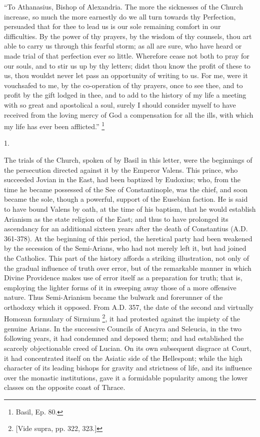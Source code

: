``To Athanasius, Bishop of Alexandria. The more the sicknesses
of the Church increase, so much the more earnestly do we all turn
towards thy Perfection, persuaded that for thee to lead us is our sole
remaining comfort in our difficulties. By the power of thy prayers, by
the wisdom of thy counsels, thou art able to carry us through this
fearful storm; as all are sure, who have heard or made trial of that
perfection ever so little. Wherefore cease not both to pray for our
souls, and to stir us up by thy letters; didst thou know the profit of
these to us, thou wouldst never let pass an opportunity of writing to
us. For me, were it vouchsafed to me, by the co-operation of thy
prayers, once to see thee, and to profit by the gift lodged in thee,
and to add to the history of my life a meeting with so great and
apostolical a soul, surely I should consider myself to have received
from the loving mercy of God a compensation for all the ills, with
which my life has ever been afflicted.'' \footnote{Basil, Ep. 80.}

1.

The trials of the Church, spoken of by Basil in this letter, were
the beginnings of the persecution directed against it by the Emperor
Valens. This prince, who succeeded Jovian in the East, had been
baptized by Eudoxius; who, from the time he became possessed of the
See of Constantinople, was the chief, and soon became the sole, though
a powerful, support of the Eusebian faction. He is said to have bound
Valens by oath, at the time of his baptism, that he would establish
Arianism as the state religion of the East; and thus to have prolonged
its ascendancy for an additional sixteen years after the death
of Constantius (A.D. 361-378). At the beginning
of this period, the heretical party had been weakened by the secession
of the Semi-Arians, who had not merely left it, but had joined the
Catholics. This part of the history affords a striking illustration,
not only of the gradual influence of truth over error, but of the
remarkable manner in which Divine Providence makes use of error itself
as a preparation for truth; that is, employing the lighter forms of it
in sweeping away those of a more offensive nature. Thus Semi-Arianism
became the bulwark and forerunner of the orthodoxy which it opposed.
From A.D. 357, the date of the second and
virtually Homœan formulary of Sirmium \footnote{[Vide supra, pp. 322, 323.]}, it had protested against the impiety of the genuine Arians. In
the successive Councils of Ancyra and Seleucia, in the two following
years, it had condemned and deposed them; and had established the
scarcely objectionable creed of Lucian. On its own subsequent disgrace
at Court, it had concentrated itself on the Asiatic side of the
Hellespont; while the high character of its leading bishops for
gravity and strictness of life, and its influence over the monastic
institutions, gave it a formidable popularity among the lower classes
on the opposite coast of Thrace.

